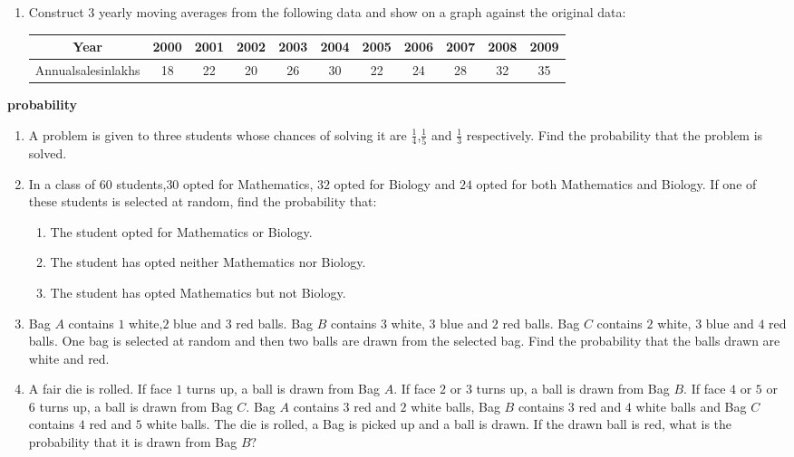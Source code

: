 \documentclass[12pt,-letter paper]{article}
\begin{document}
\begin{enumerate}
\item Construct $3$ yearly moving averages from the following data and show on a graph against the original data: \\
	 \begin{tabular}{|c|c|c|c|c|c|c|c|c|c|c|}
		 \hline
		 	       Year& 2000 & 2001 & 2002 & 2003 & 2004 & 2005 & 2006 & 2007 & 2008 & 2009\\
			       \hline
 Annualsalesinlakhs & 18 & 22 & 20 & 26 & 30 & 22 & 24 & 28 & 32 & 35\\
				       \hline
				              \end{tabular}

\end{enumerate}
\begin{center}
	\textbf{probability}
\end{center}
\begin{enumerate}
		 \item A problem is given to three students whose chances of solving it are $\frac{1}{4}$,$\frac{1}{5}$ and $\frac{1}{3}$ respectively. Find the probability that the problem is solved.
		 \item In a class of $60$ students,$30$ opted for Mathematics, $32$ opted for Biology and $24$ opted for both Mathematics and Biology. If one of these students is selected at random, find the probability that:  \begin{enumerate}
				 \item The student opted for Mathematics or Biology. 
				 \item The student has opted neither Mathematics nor Biology. 
		 \item The student has opted Mathematics but not Biology. 
		 \end{enumerate}
	 \item Bag $A$ contains $1$ white,$ 2$ blue and $3$ red balls. Bag $B$ contains $3$ white, $3$ blue and $2$ red balls. Bag $C$ contains $2$ white, $3$ blue and $4$ red balls. One bag is selected at random and then two balls are drawn from the selected bag. Find the probability that the balls drawn are white and red.
	 \item A fair die is rolled. If face $1$ turns up, a ball is drawn from Bag $A$. If face $2$ or $3$ turns up, a ball is drawn from Bag $B$. If face $4$ or $5$ or $6$ turns up, a ball is drawn from Bag $C$. Bag $A$ contains $3$ red and $2$ white balls, Bag $B$ contains $3$ red and $4$ white balls and Bag $C$ contains $4$ red and $5$ white balls. The die is rolled, a Bag is picked up and a ball is drawn. If the drawn ball is red, what is the probability that it is drawn from Bag $B?$ 

\end{enumerate}
\end{document}
